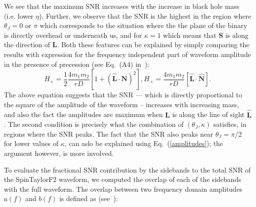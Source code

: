 We see that the maximum SNR increases with the increase in black hole mass
(i.e. lower $\eta$). Further, we observe that the SNR is the highest in the
region where  $\theta_{J} = 0$ or $\pi$ which corresponds to the situation where
the the plane of  the binary is directly overhead or underneath us, and for
$\kappa = 1$ which means that  $\mathbf{S}$ is along the direction of
$\mathbf{L}$. Both these features can be explained by simply comparing the
results with expression for the frequency independent part of waveform amplitude 
in the presence of precession (see Eq.~(A4) in~\cite{Apostolatos1994}):
\label{amplitudes}
\begin{equation}
H_{+} = \frac{1}{2}\frac{4 m_{1}m_{2}}{rD} \left[1 + (\hat{\mathbf{L}}\cdot\hat{\mathbf{N}})^{2}\right], 
H_{\times} = \frac{4 m_{1}m_{2}}{rD}\left[\hat{\mathbf{L}}\cdot\hat{\mathbf{N}}\right].
\end{equation}
The above equation suggests that the SNR --- which is directly proportional to
the square of the  amplitude of the waveform -- increases with increasing mass,
and also the fact the amplitudes  are maximum when $\mathbf{L}$ is along the
line of sight $\hat{\mathbf{L}}$. The second condition is precisely what the
combination of $(\theta_J, \kappa)$ satisfies, in regions where the SNR peaks.
The fact that the SNR also peaks near $\theta_J = \pi/2$ for lower values of
$\kappa$, can aslo be explained using Eq.~(\ref{amplitudes}); the argument
however, is more involved.

To evaluate the fractional SNR contribution by the sidebands to the total SNR of
the SpinTaylorF2 waveform,  we computed the overlap of each of the sidebands
with the full waveform. The overlap between two frequency domain amplitudes
$a(f)$ and $b(f)$ is defined as (see~\cite{Lundgren2014}):

